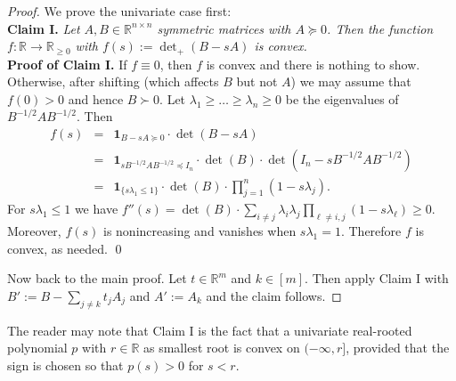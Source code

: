 \documentclass[12pt,english]{article}
\theoremstyle{theorem}
\theoremstyle{remark}
\providecommand{\setR}{\mathbb{R}}
\begin{document}
\begin{proof}
  We prove the univariate case first: \\
  {\bf Claim I.} \emph{Let $A,B \in \setR^{n \times n}$ symmetric matrices with $A \succeq 0$. Then the function  $f : \setR \to \setR_{\ge 0}$ with
$
        f(s):= \det_+(B-sA)
$
is convex.} \\
{\bf Proof of Claim I.} If $f \equiv 0$, then $f$ is convex and there
is nothing to show.
Otherwise, after shifting (which affects $B$ but not $A$) we may assume that $f(0)>0$
and hence $B \succ 0$.
Let $\lambda_1 \ge \dots \ge \lambda_n\geq0$ be the eigenvalues of $B^{-1/2}AB^{-1/2}$. Then
\begin{eqnarray*}
  f(s) &=& \bm{1}_{B - sA \succeq 0} \cdot \det(B-sA) \\
  &=& \bm{1}_{s B^{-1/2}AB^{-1/2} \preceq I_n} \cdot \det(B) \cdot \det(I_n - s B^{-1/2}AB^{-1/2}) \\ &=& \mathbf{1}_{\{s \lambda_1 \leq 1\}} \cdot \det(B) \cdot \prod_{j=1}^n(1-s\lambda_j).
\end{eqnarray*}
For $s\lambda_1 \le 1$ we have $f''(s) =\det(B) \cdot \sum_{i\ne j}\lambda_i\lambda_j \prod_{\ell\ne i, j}(1-s\lambda_\ell)\ge 0$. Moreover, $f(s)$ is nonincreasing and vanishes when $s\lambda_1 =1$. Therefore $f$ is convex, as needed. \qed

Now back to the main proof. Let $t \in \setR^m$ and  $k \in [m]$.
Then apply Claim I with $B' :=B-\sum_{j\neq k}t_jA_j$ and $A' := A_k$ and the claim follows. 
\end{proof}
The reader may note that Claim I is the fact that a univariate real-rooted polynomial $p$ with $r \in \setR$ as smallest root is convex on $(-\infty,r]$, provided that the sign is chosen so that $p(s)>0$ for $s<r$.
\end{document}
